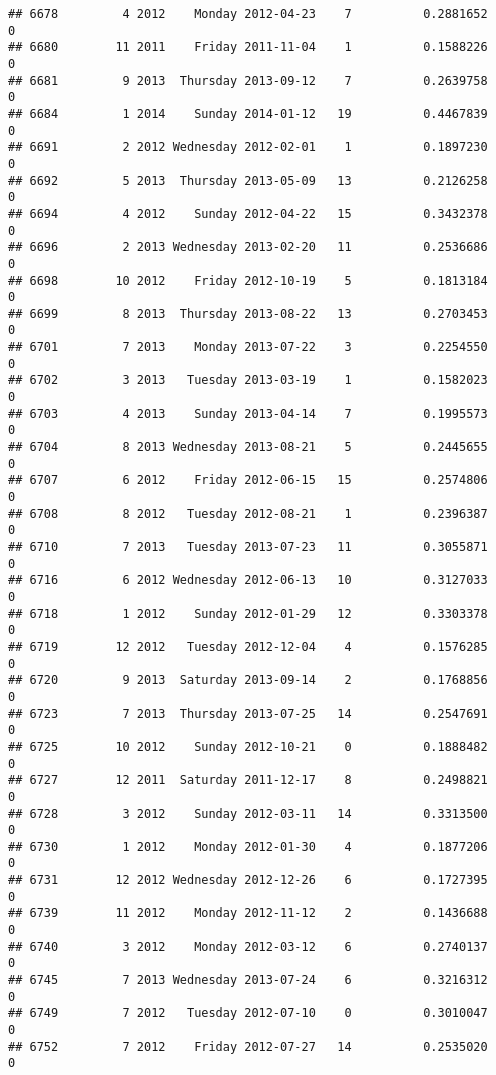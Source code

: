 \documentclass[
]{article}
\begin{document}
\begin{verbatim}
## 6678         4 2012    Monday 2012-04-23    7          0.2881652             0
## 6680        11 2011    Friday 2011-11-04    1          0.1588226             0
## 6681         9 2013  Thursday 2013-09-12    7          0.2639758             0
## 6684         1 2014    Sunday 2014-01-12   19          0.4467839             0
## 6691         2 2012 Wednesday 2012-02-01    1          0.1897230             0
## 6692         5 2013  Thursday 2013-05-09   13          0.2126258             0
## 6694         4 2012    Sunday 2012-04-22   15          0.3432378             0
## 6696         2 2013 Wednesday 2013-02-20   11          0.2536686             0
## 6698        10 2012    Friday 2012-10-19    5          0.1813184             0
## 6699         8 2013  Thursday 2013-08-22   13          0.2703453             0
## 6701         7 2013    Monday 2013-07-22    3          0.2254550             0
## 6702         3 2013   Tuesday 2013-03-19    1          0.1582023             0
## 6703         4 2013    Sunday 2013-04-14    7          0.1995573             0
## 6704         8 2013 Wednesday 2013-08-21    5          0.2445655             0
## 6707         6 2012    Friday 2012-06-15   15          0.2574806             0
## 6708         8 2012   Tuesday 2012-08-21    1          0.2396387             0
## 6710         7 2013   Tuesday 2013-07-23   11          0.3055871             0
## 6716         6 2012 Wednesday 2012-06-13   10          0.3127033             0
## 6718         1 2012    Sunday 2012-01-29   12          0.3303378             0
## 6719        12 2012   Tuesday 2012-12-04    4          0.1576285             0
## 6720         9 2013  Saturday 2013-09-14    2          0.1768856             0
## 6723         7 2013  Thursday 2013-07-25   14          0.2547691             0
## 6725        10 2012    Sunday 2012-10-21    0          0.1888482             0
## 6727        12 2011  Saturday 2011-12-17    8          0.2498821             0
## 6728         3 2012    Sunday 2012-03-11   14          0.3313500             0
## 6730         1 2012    Monday 2012-01-30    4          0.1877206             0
## 6731        12 2012 Wednesday 2012-12-26    6          0.1727395             0
## 6739        11 2012    Monday 2012-11-12    2          0.1436688             0
## 6740         3 2012    Monday 2012-03-12    6          0.2740137             0
## 6745         7 2013 Wednesday 2013-07-24    6          0.3216312             0
## 6749         7 2012   Tuesday 2012-07-10    0          0.3010047             0
## 6752         7 2012    Friday 2012-07-27   14          0.2535020             0

\end{verbatim}
\end{document}

